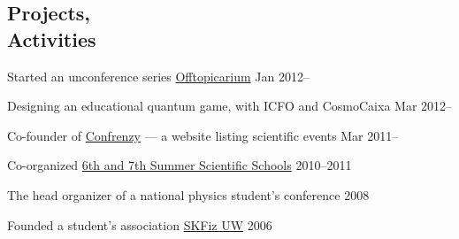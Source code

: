 \documentclass[margin,line]{resume}
\begin{document}
\begin{resume}
    \section{\mysidestyle Projects,\\Activities}

    \begin{list2}
    \item Started an unconference series \href{http://offtopicarium.wikidot.com/en:start}{Offtopicarium} \hfill { Jan 2012--}
    \item Designing an educational quantum game, with ICFO and CosmoCaixa \hfill { Mar 2012--}
    \item Co-founder of \href{https://confrenzy.com}{Confrenzy} --- a website listing scientific events \hfill { Mar 2011--}

    \item Co-organized \href{http://warsztatywww.wikidot.com/en}{6th and 7th Summer Scientific Schools} \hfill { 2010--2011}
    \item The head organizer of a national physics student's conference \hfill { 2008}
    \item Founded a student's association \href{http://skfiz.fuw.edu.pl/en}{SKFiz UW} \hfill { 2006}
    \end{list2}



\end{resume}
\end{document}
